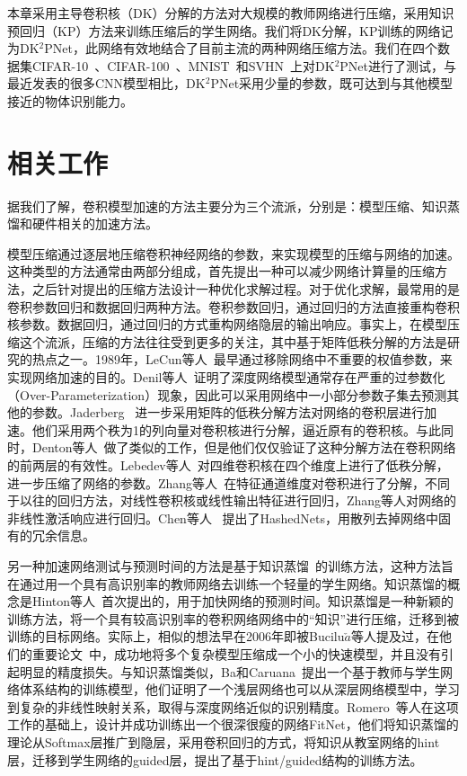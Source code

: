 本章采用主导卷积核（DK）分解的方法对大规模的教师网络进行压缩，采用知识预回归（KP）方法来训练压缩后的学生网络。我们将DK分解，KP训练的网络记为DK$^2$PNet，此网络有效地结合了目前主流的两种网络压缩方法。我们在四个数据集CIFAR-10~\cite{krizhevsky2009learning}、CIFAR-100~\cite{krizhevsky2009learning}、MNIST~\cite{lecun1998gradient}和SVHN~\cite{netzer2011reading}上对DK$^2$PNet进行了测试，与最近发表的很多CNN模型相比，DK$^2$PNet采用少量的参数，既可达到与其他模型接近的物体识别能力。

\section{相关工作}
\label{sec:acc:relate}

据我们了解，卷积模型加速的方法主要分为三个流派，分别是：模型压缩、知识蒸馏和硬件相关的加速方法。

模型压缩通过逐层地压缩卷积神经网络的参数，来实现模型的压缩与网络的加速。这种类型的方法通常由两部分组成，首先提出一种可以减少网络计算量的压缩方法，之后针对提出的压缩方法设计一种优化求解过程。对于优化求解，最常用的是卷积参数回归和数据回归两种方法。卷积参数回归，通过回归的方法直接重构卷积核参数。数据回归，通过回归的方式重构网络隐层的输出响应\cite{zhang2015efficient}。事实上，在模型压缩这个流派，压缩的方法往往受到更多的关注，其中基于矩阵低秩分解的方法是研究的热点之一。1989年，LeCun等人~\cite{lecun1989optimal}最早通过移除网络中不重要的权值参数，来实现网络加速的目的。Denil等人~\cite{denil2013predicting}证明了深度网络模型通常存在严重的过参数化（Over-Parameterization）现象，因此可以采用网络中一小部分参数子集去预测其他的参数。Jaderberg~\cite{jaderberg2014speeding} 进一步采用矩阵的低秩分解方法对网络的卷积层进行加速。他们采用两个秩为1的列向量对卷积核进行分解，逼近原有的卷积核。与此同时，Denton等人~\cite{denton2014exploiting}做了类似的工作，但是他们仅仅验证了这种分解方法在卷积网络的前两层的有效性。Lebedev等人~\cite{lebedev2014speeding}对四维卷积核在四个维度上进行了低秩分解，进一步压缩了网络的参数。Zhang等人~\cite{zhang2015efficient}在特征通道维度对卷积进行了分解，不同于以往的回归方法，对线性卷积核或线性输出特征进行回归，Zhang等人对网络的非线性激活响应进行回归。Chen等人~\cite{chen2015compressing} 提出了HashedNets，用散列去掉网络中固有的冗余信息。

另一种加速网络测试与预测时间的方法是基于知识蒸馏~\cite{hinton2015distilling}的训练方法，这种方法旨在通过用一个具有高识别率的教师网络去训练一个轻量的学生网络。知识蒸馏的概念是Hinton等人~\cite{hinton2015distilling}首次提出的，用于加快网络的预测时间。知识蒸馏是一种新颖的训练方法，将一个具有较高识别率的卷积网络网络中的“知识”进行压缩，迁移到被训练的目标网络。实际上，相似的想法早在2006年即被Bucilu$\check{a}$等人提及过，在他们的重要论文~\cite{bucilu2006model}中，成功地将多个复杂模型压缩成一个小的快速模型，并且没有引起明显的精度损失。与知识蒸馏类似，Ba和Caruana~\cite{ba2014deep}提出一个基于教师与学生网络体系结构的训练模型，他们证明了一个浅层网络也可以从深层网络模型中，学习到复杂的非线性映射关系，取得与深度网络近似的识别精度。Romero~\cite{romero2014fitnets}等人在这项工作的基础上，设计并成功训练出一个很深很瘦的网络FitNet，他们将知识蒸馏的理论从Softmax层推广到隐层，采用卷积回归的方式，将知识从教室网络的hint层，迁移到学生网络的guided层，提出了基于hint/guided结构的训练方法。

